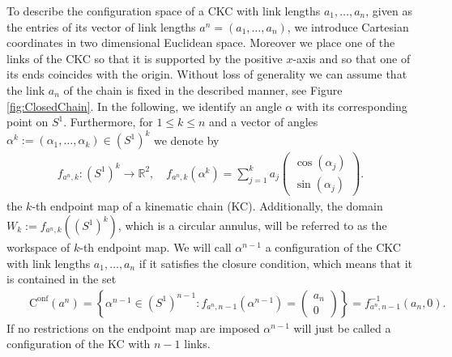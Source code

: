 \documentclass[10pt,a4paper]{article}
\theoremstyle{definition}
\theoremstyle{remark}
\numberwithin{equation}{section}
\newcommand{\Cs}{\mathrm{C}^{\mathrm{onf}}}
\newcommand{\R}{\mathbb{R}}
\begin{document}
To describe the configuration space of a CKC with link lengths $a_1, \dots, a_n$, given as the entries of its vector of link lengths $a^n= (a_1, \dots, a_n)$,  we introduce Cartesian coordinates in two dimensional Euclidean space. Moreover we place one of the links of the CKC so that it is supported by the positive $x$-axis and so that one of its ends coincides with the origin. Without loss of generality we can assume that the link $a_n$ of the chain is fixed in the described manner, see Figure \ref{fig:ClosedChain}. In the following, we identify an angle $\alpha$ with its corresponding point on $S^1$. Furthermore, for $1 \leq k \leq n$ and a vector of angles $\alpha^k := (\alpha_1, \dots, \alpha_{k})\in \left(S^1\right)^k $ we denote by 
\begin{align}
f_{a^n ,k} \colon  \left( S^1\right)^k \rightarrow \R^2, \quad  f_{a^n ,k} (\alpha^k) = \sum_{j=1}^{k} a_j \begin{pmatrix} \cos(\alpha_j) \\
\sin(\alpha_j)
\end{pmatrix}.
\end{align}
the $k$-th endpoint map of a kinematic chain (KC). Additionally, the domain $W_k :=  f_{a^n ,k}\left( (S^1)^k \right)$, which is a circular annulus, will be referred to as the workspace of $k$-th endpoint map. 
We will call $\alpha^{n-1}$ a configuration of the CKC with link lengths $a_1, \dots,a_n$ if it satisfies the closure condition, which means that it is contained in the set
\begin{align}\label{clos_eq}
&& \Cs ({a^n}) = \left\{ \alpha^{n-1} \in \left(S^1\right)^{n-1}  \colon  f_{a^n,n-1}\left( \alpha^{n-1} \right) =
\begin{pmatrix} a_n \\ 0
\end{pmatrix} \right\} = f_{a^n , n-1}^{-1} \left(a_n, 0\right).
\end{align}
If no restrictions on the endpoint map are imposed $\alpha^{n-1}$ will just be called a configuration of the KC with $n-1$ links.  
\end{document}
